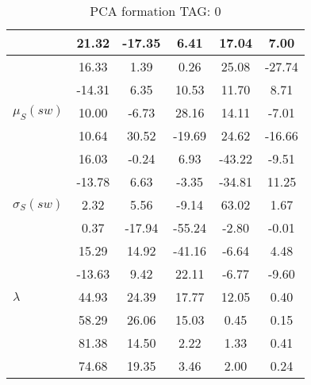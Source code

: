 \begin{table}[h!]
\begin{center}
\begin{tabular}{| l | c | c | c | c | c |}
 & 21.32  & -17.35  & 6.41  & 17.04  & 7.00 \\\hline
 & 16.33  & 1.39  & 0.26  & 25.08  & -27.74 \\\hline
 & -14.31  & 6.35  & 10.53  & 11.70  & 8.71 \\\hline
$\mu_S(sw)$ & 10.00  & -6.73  & 28.16  & 14.11  & -7.01 \\\hline
 & 10.64  & 30.52  & -19.69  & 24.62  & -16.66 \\\hline
 & 16.03  & -0.24  & 6.93  & -43.22  & -9.51 \\\hline
 & -13.78  & 6.63  & -3.35  & -34.81  & 11.25 \\\hline
$\sigma_S(sw)$ & 2.32  & 5.56  & -9.14  & 63.02  & 1.67 \\\hline
 & 0.37  & -17.94  & -55.24  & -2.80  & -0.01 \\\hline
 & 15.29  & 14.92  & -41.16  & -6.64  & 4.48 \\\hline
 & -13.63  & 9.42  & 22.11  & -6.77  & -9.60 \\\hline
$\lambda$ & 44.93  & 24.39  & 17.77  & 12.05  & 0.40 \\\hline
 & 58.29  & 26.06  & 15.03  & 0.45  & 0.15 \\\hline
 & 81.38  & 14.50  & 2.22  & 1.33  & 0.41 \\\hline
 & 74.68  & 19.35  & 3.46  & 2.00  & 0.24 \\\hline
\end{tabular}
\caption{PCA formation TAG: 0}
\end{center}
\end{table}